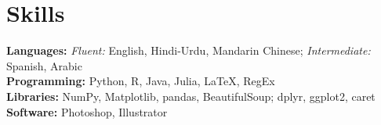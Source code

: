 \documentclass[letterpaper,10pt]{article}
\newcommand{\resumeSubHeadingListEnd}{\end{itemize}}
\begin{document}


\section{Skills}
 \begin{itemize}[leftmargin=0.15in, label={}]
    \small{\item{
     \textbf{Languages:}{ \textit{Fluent:} English, Hindi-Urdu, Mandarin Chinese; \textit{Intermediate:} Spanish, Arabic} \\
     \textbf{Programming:}{ Python, R, Java, Julia, \LaTeX, RegEx} \\
     \textbf{Libraries:}{ NumPy, Matplotlib, pandas, BeautifulSoup; dplyr, ggplot2, caret} \\
     \textbf{Software:}{ Photoshop, Illustrator}
    }}
 \end{itemize}


\end{document}
